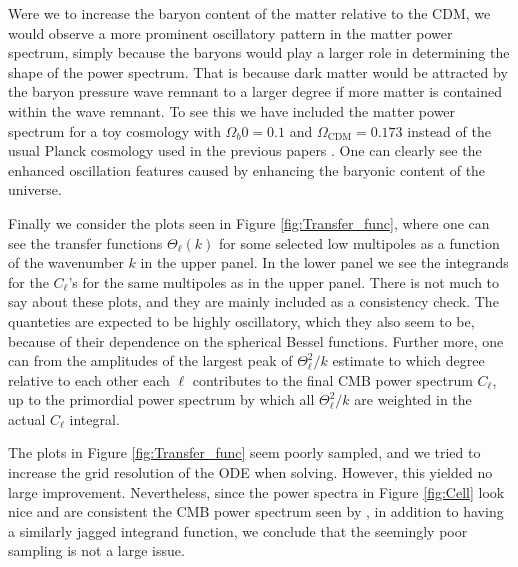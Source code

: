 \documentclass[twocolumn]{aastex62}
\begin{document}
Were we to increase the baryon content of the matter relative to the CDM, we would observe a more prominent oscillatory pattern in the matter power spectrum, simply because the baryons would play a larger role in determining the shape of the power spectrum. That is because dark matter would be attracted by the baryon pressure wave remnant to a larger degree if more matter is contained within the wave remnant. To see this we have included the matter power spectrum for a toy cosmology with $\Omega_b0 = 0.1$ and $\Omega_\mathrm{CDM} = 0.173$ instead of the usual Planck cosmology used in the previous papers \cite{stutzer:2020a, stutzer:2020b, stutzer:2020c}. One can clearly see the enhanced oscillation features caused by enhancing the baryonic content of the universe.

Finally we consider the plots seen in Figure \ref{fig:Transfer_func}, where one can see the transfer functions $\Theta_\ell(k)$ for some selected low multipoles as a function of the wavenumber $k$ in the upper panel. In the lower panel we see the integrands for the $C_\ell$'s for the same multipoles as in the upper panel. There is not much to say about these plots, and they are mainly included as a consistency check. The quanteties are expected to be highly oscillatory, which they also seem to be, because of their dependence on the spherical Bessel functions. Further more, one can from the amplitudes of the largest peak of $\Theta_\ell^2 / k$ estimate to which degree relative to each other each $\ell$ contributes to the final CMB power spectrum $C_\ell$, up to the primordial power spectrum by which all $\Theta_\ell^2/k$ are weighted in the actual $C_\ell$ integral. 

The plots in Figure \ref{fig:Transfer_func} seem poorly sampled, and we tried to increase the grid resolution of the ODE when solving. However, this yielded no large improvement. Nevertheless, since the power spectra in Figure \ref{fig:Cell} look nice and are consistent the CMB power spectrum seen by \cite{callin:2006}, in addition to \cite{callin:2006} having a similarly jagged integrand function, we conclude that the seemingly poor sampling is not a large issue.
\end{document}
